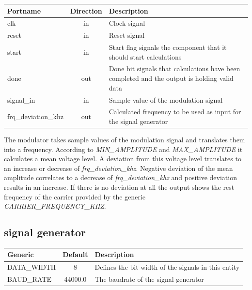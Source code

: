 \vspace{5mm}

\begin{adjustwidth}{-3.7cm}{}
	\begin{center}
		\begin{tabular}{ | l | c | l | }
			\hline
			\textbf{Portname} & \textbf{Direction} & \textbf{Description} \\
			\hline
			clk & in & Clock signal \\
			reset & in  & Reset signal \\
			start & in  & Start flag signals the component that it should start calculations \\
			done & out  & Done bit signals that calculations have been completed and the output is holding valid data \\
			signal\_in & in  & Sample value of the modulation signal \\
			frq\_deviation\_khz & out  & Calculated frequency to be used as input for the signal generator \\
			\hline
		\end{tabular} 
	\end{center}
\end{adjustwidth}

\vspace{4mm}

The modulator takes sample values of the modulation signal and translates them into a frequency. According to \textit{MIN\_AMPLITUDE} and \textit{MAX\_AMPLITUDE} it calculates a mean voltage level. A deviation from this voltage level translates to an increase or decrease of \textit{frq\_deviation\_khz}. Negative deviation of the mean amplitude correlates to a decrease of \textit{frq\_deviation\_khz} and positive deviation results in an increase. If there is no deviation at all the output shows the rest frequency of the carrier provided by the generic \textit{CARRIER\_FREQUENCY\_KHZ}.

\subsection{signal generator}

\begin{center}
	\begin{tabular}{ | l | c | l | }
		\hline
		\textbf{Generic} & \textbf{Default} & \textbf{Description} \\ \hline
		DATA\_WIDTH & 8 & Defines the bit width of the signals in this entity \\
		BAUD\_RATE & 44000.0 & The baudrate of the signal generator \\
		\hline
	\end{tabular} 
\end{center}


